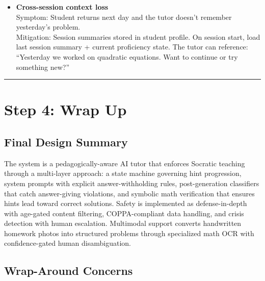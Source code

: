 \begin{itemize}
  \item \textbf{Cross-session context loss}\\
    Symptom: Student returns next day and the tutor doesn't remember yesterday's problem.\\
    Mitigation: Session summaries stored in student profile. On session start, load last session summary + current proficiency state. The tutor can reference: ``Yesterday we worked on quadratic equations. Want to continue or try something new?''
\end{itemize}

\bigskip\hrule\bigskip

\section*{Step 4: Wrap Up}

\subsection*{Final Design Summary}

The system is a pedagogically-aware AI tutor that enforces Socratic teaching through a multi-layer approach: a state machine governing hint progression, system prompts with explicit answer-withholding rules, post-generation classifiers that catch answer-giving violations, and symbolic math verification that ensures hints lead toward correct solutions. Safety is implemented as defense-in-depth with age-gated content filtering, COPPA-compliant data handling, and crisis detection with human escalation. Multimodal support converts handwritten homework photos into structured problems through specialized math OCR with confidence-gated human disambiguation.

\subsection*{Wrap-Around Concerns}

